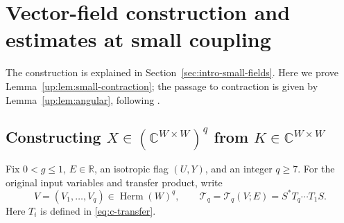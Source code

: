 \documentclass[11pt]{article}
\numberwithin{equation}{section}
\theoremstyle{remark}
\newcommand{\C}{\mathbb C}
\newcommand{\R}{\mathbb R}
\begin{document}
\section{Vector-field construction and estimates at small coupling}
\label{sec:small-upper-proof}

The construction is explained in Section~\ref{sec:intro-small-fields}.
Here we prove Lemma~\ref{up:lem:small-contraction}; the passage to
contraction is given by Lemma~\ref{up:lem:angular}, following
\cite[Proposition~2.6 and Claims~2.7--2.8]{Drogin}.

\subsection{Constructing \texorpdfstring{$X\in(\C^{W\times W})^q$}{X in (C\string^(W x W))\string^q} from \texorpdfstring{$K\in\C^{W\times W}$}{K in C\string^(W x W)}}
\label{su:sec:construction}

Fix $0<g\le1$, $E\in\R$, an isotropic flag $(U,Y)$, and an integer
$q\ge7$. For the original input variables and transfer product, write
\[
 V=(V_1,\ldots,V_q)\in\operatorname{Herm}(W)^q,\qquad
 \mathcal T_q=\mathcal T_q(V;E)=S^*T_q\cdots T_1S.
\]
Here $T_i$ is defined in \eqref{eq:c-transfer}.
\end{document}
